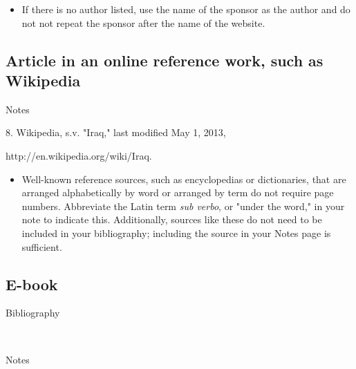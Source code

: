 \begin{itemize}\item If there is no author listed, use the name of the sponsor
as the author and do not  not repeat the sponsor after the name of the
website.\end{itemize}

\subsection{Article in an online reference work, such as Wikipedia}

\begin{center}{Notes}\end{center} 
\begin{singlespace}
\noindent\hspace{1.2cm}8. Wikipedia, s.v.
"Iraq," last modified May 1, 2013,

http://en.wikipedia.org/wiki/Iraq.
\end{singlespace}


\begin{itemize}\item Well-known reference sources, such as encyclopedias or
dictionaries, that are arranged alphabetically by word or arranged by term do
not require page numbers. Abbreviate
the Latin term \emph{sub verbo}, or "under the word," in your note to indicate
this. Additionally, sources like these do not need to be included in your bibliography; including the source in your Notes page is sufficient. \end{itemize}

\subsection{E-book} \begin{center}{Bibliography}\end{center}

\begin{singlespace}
\noindent{}\\

\noindent{}
\end{singlespace}

\begin{center}{Notes}\end{center}

